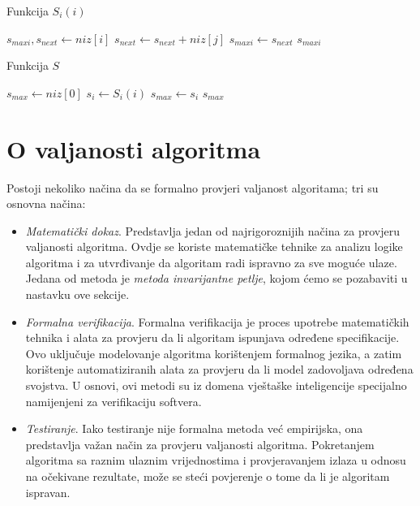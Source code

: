  

 \begin{algorithm}[!ht]
 	\caption{Funkcija $S_i(i)$}\label{S_i}
 	\begin{algorithmic}[1]
 		\State $s_{maxi}, s_{next} \gets niz[i]$
 		\State $s_{next} \gets s_{next} + niz[j]$
 		\State $s_{maxi} \gets s_{next}$
 		\EndIf
 		\EndFor  
 		\State \Return $s_{maxi}$
 		\EndProcedure
 	\end{algorithmic}
 \end{algorithm}



\begin{algorithm}[H]
	\caption{Funkcija $S$}\label{S}
	\begin{algorithmic}[1]
		\State $s_{max}\gets niz[0]$ 
		\State $s_i \gets  S_i(i)$ 
		    \State $s_{max} \gets s_{i}$
		  \EndIf
		\EndFor  
		\State  \Return  $s_{max}$
		\EndProcedure
	\end{algorithmic}
\end{algorithm}

\section{O valjanosti algoritma}

Postoji nekoliko načina da se formalno provjeri valjanost algoritama; tri  su osnovna načina:

\begin{itemize}
	\item \textit{Matematički dokaz}. Predstavlja jedan od najrigoroznijih načina za provjeru valjanosti algoritma.  %
	Ovdje se koriste matematičke tehnike za analizu logike algoritma i za utvrđivanje da algoritam radi ispravno za sve moguće ulaze. Jedana od metoda je \textit{metoda invarijantne petlje}, kojom ćemo se pozabaviti u nastavku ove sekcije. 
	
    \item \textit{Formalna verifikacija}. Formalna verifikacija je proces upotrebe matematičkih tehnika i alata za provjeru da li algoritam ispunjava određene specifikacije. Ovo uključuje modelovanje algoritma korištenjem formalnog jezika, a zatim korištenje automatiziranih alata za provjeru da li model zadovoljava određena svojstva. U osnovi, ovi metodi su iz domena vještaške inteligencije specijalno namijenjeni za verifikaciju softvera.
    \item \textit{Testiranje}.  Iako testiranje nije formalna metoda već empirijska, ona predstavlja važan način za provjeru valjanosti algoritma. Pokretanjem algoritma sa raznim ulaznim vrijednostima i provjeravanjem izlaza u odnosu na očekivane rezultate, može se steći povjerenje o tome da li je algoritam ispravan.

\end{itemize}


